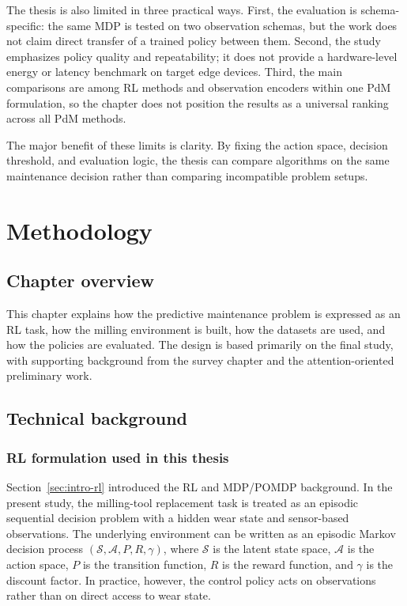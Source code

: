 \documentclass[12pt,oneside]{book}
\begin{document}
The thesis is also limited in three practical ways. First, the evaluation is schema-specific: the same MDP is tested on two observation schemas, but the work does not claim direct transfer of a trained policy between them. Second, the study emphasizes policy quality and repeatability; it does not provide a hardware-level energy or latency benchmark on target edge devices. Third, the main comparisons are among RL methods and observation encoders within one PdM formulation, so the chapter does not position the results as a universal ranking across all PdM methods.

The major benefit of these limits is clarity. By fixing the action space, decision threshold, and evaluation logic, the thesis can compare algorithms on the same maintenance decision rather than comparing incompatible problem setups.



\chapter{Methodology}\label{ch:methodology}

\section{Chapter overview}
This chapter explains how the predictive maintenance problem is expressed as an RL task, how the milling environment is built, how the datasets are used, and how the policies are evaluated. The design is based primarily on the final study, with supporting background from the survey chapter and the attention-oriented preliminary work.

\section{Technical background}
\subsection{RL formulation used in this thesis}
Section~\ref{sec:intro-rl} introduced the RL and MDP/POMDP background. In the present study, the milling-tool replacement task is treated as an episodic sequential decision problem with a hidden wear state and sensor-based observations. The underlying environment can be written as an episodic Markov decision process $(\mathcal{S},\mathcal{A},P,R,\gamma)$, where $\mathcal{S}$ is the latent state space, $\mathcal{A}$ is the action space, $P$ is the transition function, $R$ is the reward function, and $\gamma$ is the discount factor. In practice, however, the control policy acts on observations rather than on direct access to wear state.
\end{document}
